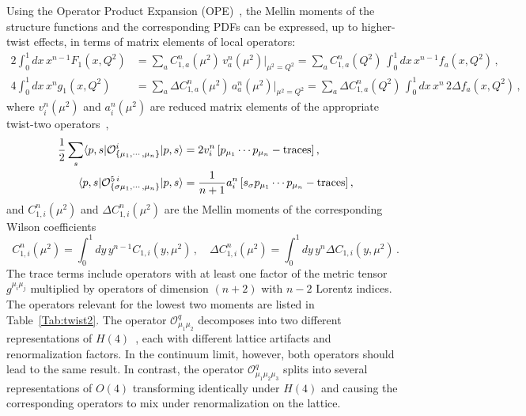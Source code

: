 Using the Operator Product Expansion (OPE)~\cite{Zimmermann:1972tv}, the Mellin 
moments of the structure functions and the corresponding PDFs can be expressed, 
up to higher-twist effects, in terms of matrix elements of local operators:
\begin{align}
\!\!\!2 \int_0^1 dx\, x^{n-1} F_1(x,Q^2) &= \sum_a C_{1,a}^n(\mu^2)\, v_a^n(\mu^2)|_{\mu^2=Q^2} = \sum_a C_{1,a}^n(Q^2)\, \int_0^1 dx\, x^{n-1} f_a(x,Q^2)\,,\\
4 \int_0^1 dx\, x^n g_1(x,Q^2) &= \sum_a \Delta C_{1,a}^n(\mu^2)\, a_a^n(\mu^2)|_{\mu^2=Q^2} = \sum_a \Delta C_{1,a}^n(Q^2)\, \int_0^1 dx\, x^n\, 2 \Delta f_a(x,Q^2)\,,
\end{align}
where $v_i^n(\mu^2)$ and $a_i^n(\mu^2)$ are reduced matrix elements of the appropriate twist-two operators~\cite{Gockeler:1995wg},
\begin{align}
\frac{1}{2} \sum_s \langle p,s|\mathcal{O}^i_{\{\mu_1,\cdots,\mu_n\}}|p,s\rangle = {} & 2 v_i^n\, [p_{\mu_1}\cdots p_{\mu_n} - {\rm traces}] \,, \label{eq:twist2me}\\
\langle p,s|\mathcal{O}^{5\,i}_{\{\sigma \mu_1,\cdots,\mu_n\}}|p,s\rangle = {} & \frac{1}{n+1} a_i^n\, [s_\sigma p_{\mu_1}\cdots p_{\mu_n} - {\rm traces}]\,,
\end{align}
and $C_{1,i}^n(\mu^2)$ and $\Delta C_{1,i}^n(\mu^2)$ are the Mellin moments of the corresponding Wilson coefficients
\begin{equation}
C_{1,i}^n(\mu^2) = \int_0^1 dy\, y^{n-1} C_{1,i}(y,\mu^2)\,, \quad
\Delta C_{1,i}^n(\mu^2) = \int_0^1 dy\, y^n \Delta C_{1,i}(y,\mu^2)\,.
\end{equation}
The trace terms include operators with at least one factor of the metric 
tensor $g^{\mu_i \mu_j}$ multiplied by operators of dimension $(n+2)$ with 
$n-2$ Lorentz indices. 
%
The operators relevant for the lowest two moments are listed in 
Table~\ref{Tab:twist2}. 
%
The operator $\mathcal{O}^q_{\mu_1\mu_2}$ decomposes into two different 
representations of $H(4)$~\cite{Gockeler:1996mu}, each with different 
lattice artifacts and renormalization factors. 
%
In the continuum limit, however, both operators should lead to the same result. 
%
In contrast, the operator $\mathcal{O}^q_{\mu_1\mu_2\mu_3}$ splits into several 
representations of $O(4)$ transforming identically under $H(4)$ and causing 
the corresponding operators to mix under renormalization on the lattice.

